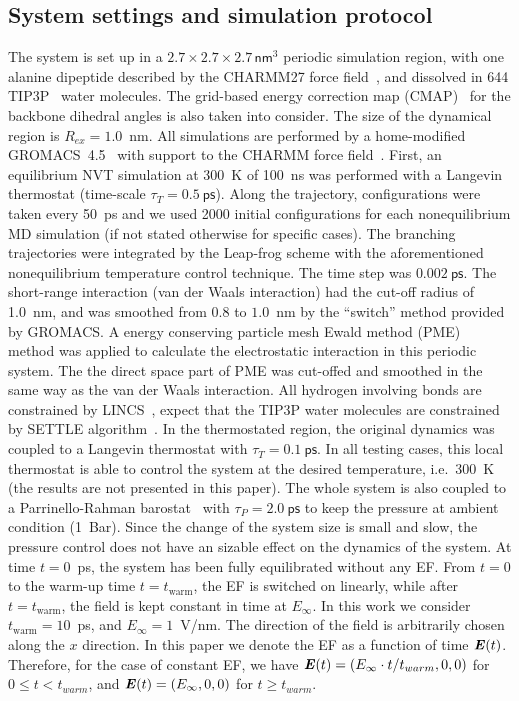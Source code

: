\documentclass[a4paper,preprint,unsortedaddress,onecolumn]{revtex4-1}
\newcommand{\recheck}[1]{{\color{red} #1}}
\newcommand{\vect}[1]{\textbf{\textit{#1}}}
\begin{document}
\subsection{System settings and simulation protocol}
The system is set up in a $2.7\times 2.7\times
2.7\, \textsf{nm}^3$ periodic simulation region, with one alanine dipeptide
described by the CHARMM27 force field~\cite{foloppe2000all}, and dissolved in 644 TIP3P~\cite{jorgensen1983comparison}
water molecules.  \recheck{The grid-based energy correction map (CMAP)~\cite{mackerell2004extending}
for the backbone dihedral angles is also taken into consider.}
The size of the  dynamical region is $R_{ex} = 1.0$~nm.
All simulations are performed by a home-modified GROMACS~4.5~\cite{pronk2013gromacs} with support to the CHARMM
force field~\cite{bjelkmar2010implementation}.
First, an equilibrium NVT simulation at 300~K of
100~\textsf{ns} was performed with a Langevin thermostat (time-scale
$\tau_T = 0.5~\textsf{ps}$).  Along the trajectory, configurations were taken every
50~\textsf{ps} and we used 2000 initial configurations for each nonequilibrium
MD simulation (if not stated otherwise for specific cases).
The branching trajectories were integrated by the
Leap-frog scheme with the aforementioned nonequilibrium
temperature control technique.  The
time step was $0.002~\textsf{ps}$.
\recheck{The short-range
interaction (van der Waals interaction)
had the cut-off radius of 1.0~nm, and was smoothed from $0.8$ to $1.0$~nm by the
``switch'' method provided by GROMACS.
A energy conserving particle mesh Ewald method (PME)~\cite{darden1993pme, essmann1995spm}
method was applied to calculate the electrostatic interaction in this
periodic system. The the direct space part of PME was cut-offed and smoothed in the
same way as the van der Waals interaction.}
\recheck {All hydrogen involving bonds are constrained by LINCS~\cite{hess1997lincs}, expect that
  the TIP3P water molecules are constrained by SETTLE algorithm~\cite{miyamoto2004settle}.}
In the thermostated region, the original dynamics was
coupled to a Langevin thermostat with $\tau_T = 0.1~\textsf{ps}$.
  In all testing cases, this local thermostat is able to control
  the system at the desired temperature, i.e.~300~K (the results
  are not presented in this paper).
The whole system is also coupled to a Parrinello-Rahman barostat~\cite{parrinello1981polymorphic} with $\tau_P = 2.0~\textsf{ps}$ to keep
the pressure at ambient condition (1~Bar). Since the
change of the system size is small and slow, the pressure control
does not have an sizable effect on the
dynamics of the system.
At time $t=0$~ps, the system
has been fully equilibrated without any EF. From $t=0$ to
the warm-up time $t=t_{\textrm{warm}}$, the EF is switched on linearly, while
after $t=t_{\textrm{warm}}$, the field is kept constant in time at
$E_{\infty}$.  In this work we consider $t_{\textrm{warm}} = 10$~ps,
and $E_{\infty} = 1$~V/nm.
The direction of the field is arbitrarily chosen along the
$x$ direction.
In this paper we denote the
EF as a function of time $\vect E(t)$.
Therefore, for the case of constant EF, we have
$\vect E(t) = (E_\infty\cdot t/t_{warm},0,0)$ for $0\leq t < t_{warm}$, and 
$\vect E(t) = (E_\infty,0,0)$
for $t \geq t_{warm}$.
\end{document}
